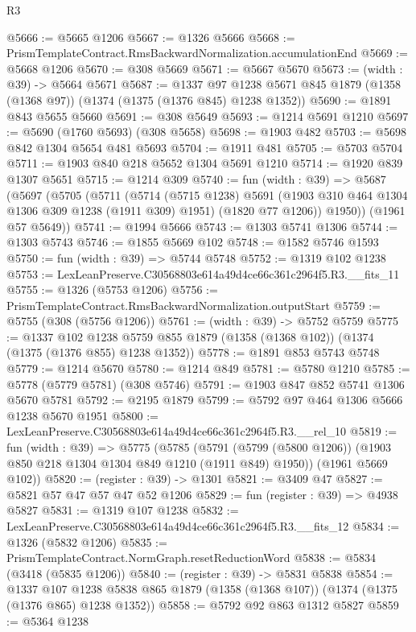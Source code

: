 \begin{lexlean}{R3}
\begin{coremodule}
@5666 := @5665 @1206
@5667 := @1326 @5666
@5668 := PrismTemplateContract.RmsBackwardNormalization.accumulationEnd
@5669 := @5668 @1206
@5670 := @308 @5669
@5671 := @5667 @5670
@5673 := (width : @39) -> @5664 @5671
@5687 := @1337
    @97
    @1238
    @5671
    @845
    @1879
    (@1358 (@1368 @97))
    (@1374 (@1375 (@1376 @845) @1238 @1352))
@5690 := @1891 @843 @5655 @5660
@5691 := @308 @5649
@5693 := @1214 @5691 @1210
@5697 := @5690 (@1760 @5693) (@308 @5658)
@5698 := @1903 @482
@5703 := @5698 @842 @1304 @5654 @481 @5693
@5704 := @1911 @481
@5705 := @5703 @5704
@5711 := @1903 @840 @218 @5652 @1304 @5691 @1210
@5714 := @1920 @839 @1307 @5651
@5715 := @1214 @309
@5740 := fun (width : @39) =>
  @5687
    (@5697
      (@5705
        (@5711
          (@5714
            (@5715 @1238)
            @5691
            (@1903 @310 @464 @1304 @1306 @309 @1238 (@1911 @309) @1951)
            (@1820 @77 @1206))
          @1950))
      (@1961 @57 @5649))
@5741 := @1994 @5666
@5743 := @1303 @5741 @1306
@5744 := @1303 @5743
@5746 := @1855 @5669 @102
@5748 := @1582 @5746 @1593
@5750 := fun (width : @39) => @5744 @5748
@5752 := @1319 @102 @1238
@5753 := LexLeanPreserve.C30568803e614a49d4ce66c361c2964f5.R3.__fits_11
@5755 := @1326 (@5753 @1206)
@5756 := PrismTemplateContract.RmsBackwardNormalization.outputStart
@5759 := @5755 (@308 (@5756 @1206))
@5761 := (width : @39) -> @5752 @5759
@5775 := @1337
    @102
    @1238
    @5759
    @855
    @1879
    (@1358 (@1368 @102))
    (@1374 (@1375 (@1376 @855) @1238 @1352))
@5778 := @1891 @853 @5743 @5748
@5779 := @1214 @5670
@5780 := @1214 @849
@5781 := @5780 @1210
@5785 := @5778 (@5779 @5781) (@308 @5746)
@5791 := @1903 @847 @852 @5741 @1306 @5670 @5781
@5792 := @2195 @1879
@5799 := @5792 @97 @464 @1306 @5666 @1238 @5670 @1951
@5800 := LexLeanPreserve.C30568803e614a49d4ce66c361c2964f5.R3.__rel_10
@5819 := fun (width : @39) =>
  @5775
    (@5785
      (@5791 (@5799 (@5800 @1206)) (@1903 @850 @218 @1304 @1304 @849 @1210 (@1911 @849) @1950))
      (@1961 @5669 @102))
@5820 := (register : @39) -> @1301
@5821 := @3409 @47
@5827 := @5821 @57 @47 @57 @47 @52 @1206
@5829 := fun (register : @39) => @4938 @5827
@5831 := @1319 @107 @1238
@5832 := LexLeanPreserve.C30568803e614a49d4ce66c361c2964f5.R3.__fits_12
@5834 := @1326 (@5832 @1206)
@5835 := PrismTemplateContract.NormGraph.resetReductionWord
@5838 := @5834 (@3418 (@5835 @1206))
@5840 := (register : @39) -> @5831 @5838
@5854 := @1337
    @107
    @1238
    @5838
    @865
    @1879
    (@1358 (@1368 @107))
    (@1374 (@1375 (@1376 @865) @1238 @1352))
@5858 := @5792 @92 @863 @1312 @5827
@5859 := @5364 @1238

\end{coremodule}
\end{lexlean}
